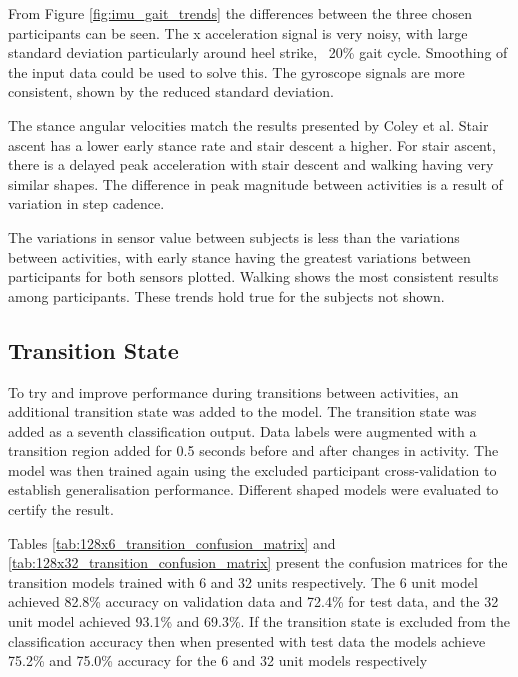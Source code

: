 \documentclass[sensors,article,submit,moreauthors,pdftex]{Definitions/mdpi}
\begin{document}
From Figure \ref{fig:imu_gait_trends} the differences between the three chosen participants can be seen. The x acceleration signal is very noisy, with large standard deviation particularly around heel strike, ~20\% gait cycle. Smoothing of the input data could be used to solve this. The gyroscope signals are more consistent, shown by the reduced standard deviation.

The stance angular velocities match the results presented by Coley et al. Stair ascent has a lower early stance rate and stair descent a higher. For stair ascent, there is a delayed peak acceleration with stair descent and walking having very similar shapes. The difference in peak magnitude between activities is a result of variation in step cadence.

The variations in sensor value between subjects is less than the variations between activities, with early stance having the greatest variations between participants for both sensors plotted. Walking shows the most consistent results among participants. These trends hold true for the subjects not shown.


\subsection{Transition State}
To try and improve performance during transitions between activities, an additional transition state was added to the model. The transition state was added as a seventh classification output. Data labels were augmented with a transition region added for 0.5 seconds before and after changes in activity. The model was then trained again using the excluded participant cross-validation to establish generalisation performance. Different shaped models were evaluated to certify the result.

Tables \ref{tab:128x6_transition_confusion_matrix} and \ref{tab:128x32_transition_confusion_matrix} present the confusion matrices for the transition models trained with 6 and 32 units respectively. The 6 unit model achieved 82.8\% accuracy on validation data and 72.4\% for test data, and the 32 unit model achieved 93.1\% and 69.3\%. If the transition state is excluded from the classification accuracy then when presented with test data the models achieve 75.2\% and 75.0\% accuracy for the 6 and 32 unit models respectively
\end{document}
